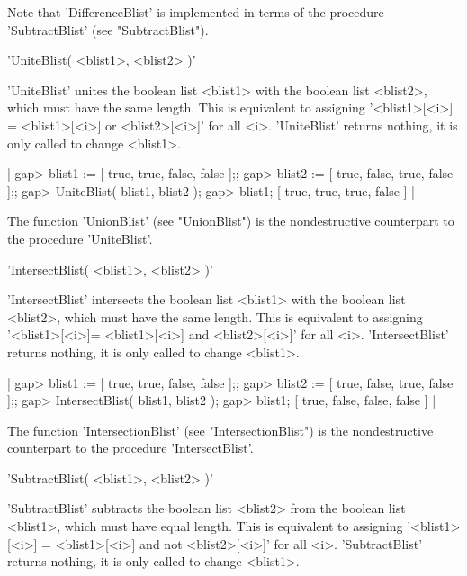 Note  that 'DifferenceBlist'  is implemented in   terms  of the procedure
'SubtractBlist' (see "SubtractBlist").


'UniteBlist( <blist1>, <blist2> )'

'UniteBlist'   unites the boolean list  <blist1>   with the boolean  list
<blist2>,   which must  have the  same  length.    This is equivalent  to
assigning '<blist1>[<i>] \:= <blist1>[<i>] or <blist2>[<i>]' for all <i>.
'UniteBlist' returns nothing, it is only called to change <blist1>.

|    gap> blist1 := [ true, true, false, false ];;
    gap> blist2 := [ true, false, true, false ];;
    gap> UniteBlist( blist1, blist2 );
    gap> blist1;
    [ true, true, true, false ] |

The  function  'UnionBlist'   (see "UnionBlist") is   the  nondestructive
counterpart to the procedure 'UniteBlist'.


'IntersectBlist( <blist1>, <blist2> )'

'IntersectBlist' intersects the  boolean list  <blist1> with the  boolean
list <blist2>,  which must have the same  length.  This is  equivalent to
assigning '<blist1>[<i>]\:= <blist1>[<i>] and <blist2>[<i>]' for all <i>.
'IntersectBlist' returns nothing, it is only called to change <blist1>.

|    gap> blist1 := [ true, true, false, false ];;
    gap> blist2 := [ true, false, true, false ];;
    gap> IntersectBlist( blist1, blist2 );
    gap> blist1;
    [ true, false, false, false ] |

The  function 'IntersectionBlist'    (see  "IntersectionBlist")   is  the
nondestructive counterpart to the procedure 'IntersectBlist'.


'SubtractBlist( <blist1>, <blist2> )'

'SubtractBlist' subtracts the boolean list <blist2> from the boolean list
<blist1>, which must have equal length.   This is equivalent to assigning
'<blist1>[<i>] \:= <blist1>[<i>]  and  not <blist2>[<i>]'  for all   <i>.
'SubtractBlist' returns nothing, it is only called to change <blist1>.

